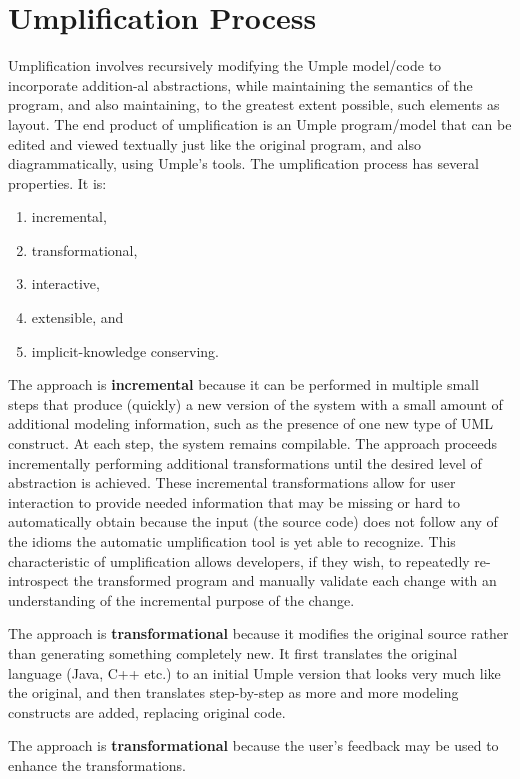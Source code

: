 \section{Umplification Process}
Umplification involves recursively modifying the Umple model/code to incorporate addition-al abstractions, while maintaining the semantics of the program, and also maintaining, to the greatest extent possible, such elements as layout. The end product of umplification is an Umple program/model that can be edited and viewed textually just like the original program, and also diagrammatically, using Umple’s tools. 
The umplification process has several properties. It is:
\begin{enumerate}
 \item incremental, 
 \item transformational,
 \item interactive,  
 \item extensible, and
 \item implicit-knowledge conserving. 
\end{enumerate}

The approach is \textbf{incremental} because it can be performed in multiple small steps that produce (quickly) a new version of the system with a small amount of additional modeling information, such as the presence of one new type of UML construct. At each step, the system remains compilable. The approach proceeds incrementally performing additional transformations until the desired level of abstraction is achieved.	These incremental transformations allow for user interaction to provide needed information that may be missing or hard to automatically obtain because the input (the source code) does not follow any of the idioms the automatic umplification tool is yet able to recognize. This characteristic of umplification allows developers, if they wish, to repeatedly re-introspect the transformed program and manually validate each change with an understanding of the incremental purpose of the change.

The approach is \textbf{transformational} because it modifies the original source rather than generating something completely new. It first translates the original language (Java, C++ etc.) to an initial Umple version that looks very much like the original, and then translates step-by-step as more and more modeling constructs are added, replacing original code.

The approach is \textbf{transformational} because the user's feedback may be used to enhance the transformations.

